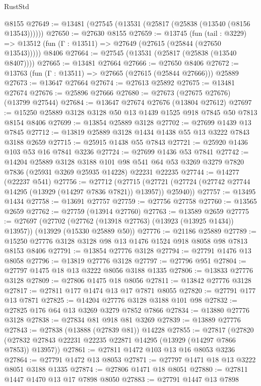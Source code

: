 \begin{lexlean}{RustStd}
\begin{coremodule}
    @8155
@27649 := @13481 (@27545 (@13531 (@25817 (@25838 (@13540 (@8156 @13543))))))
@27650 := @27630 @8155
@27659 := @13745
    (fun (tail : @3229) => @13512 (fun (Γ : @13511) => @27649 (@27615 (@25844 (@27650 @13543)))))
    @8406
@27664 := @27545 (@13531 (@25817 (@25838 (@13540 @8407))))
@27665 := @13481 @27664
@27666 := @27650 @8406
@27672 := @13763 (fun (Γ : @13511) => @27665 (@27615 (@25844 @27666))) @25889
@27673 := @13647 @27664
@27674 := @27613 @25892
@27675 := @13481 @27674
@27676 := @25896 @27666
@27680 := @27673 (@27675 @27676) (@13799 @27544)
@27684 := @13647 @27674 @27676 (@13804 @27612)
@27697 := @15250 @25889 @3128 @3128 @50 @13 @1439 @1525 @918 @7845 @50 @7813 @8154 @8406
@27699 := @13854 @25889 @3128
@27702 := @27699 @1439 @13 @7845
@27712 := @13819 @25889 @3128 @1434 @1438 @55 @13 @3222 @7843 @3188 @2659
@27715 := @25915 @1438 @55 @7843
@27721 := @25920 @1436 @103 @53 @16 @7841 @3236
@27724 := @27699 @1436 @53 @7841
@27742 := @14204
    @25889
    @3128
    @3188
    @101
    @98
    @541
    @64
    @53
    @3269
    @3279
    @7820
    @7836
    (@25931 @3269 @25935 @14228)
    @22231
    @22235
@27744 := @14277 (@22237 @541)
@27756 := @27712
    (@27715 (@27721 (@27724 (@27742 @27744 @14295 (@13929 (@14297 @7836 @7821)) @13957)) @25940))
@27757 := @13495 @1434
@27758 := @13691 @27757
@27759 := @27756 @27758
@27760 := @13565 @2659
@27762 := @27759 (@13914 @27760)
@27763 := @13589 @2659
@27775 := @27697
    (@27702 (@27762 (@13918 @27763) (@13923 (@13925 @1434)) @13957))
    (@13929 (@15330 @25889 @50))
@27776 := @21186 @25889
@27789 := @15250 @27776 @3128 @3128 @98 @13 @1476 @1524 @918 @8058 @98 @7813 @8153 @8406
@27791 := @13854 @27776 @3128
@27794 := @27791 @1476 @13 @8058
@27796 := @13819 @27776 @3128
@27797 := @27796 @951
@27804 := @27797 @1475 @18 @13 @3222 @8056 @3188 @1335
@27806 := @13833 @27776 @3128
@27809 := @27806 @1475 @18 @8056
@27811 := @13842 @27776 @3128
@27817 := @27811 @177 @1474 @13 @17 @7871 @8055
@27820 := @27791 @177 @13 @7871
@27825 := @14204 @27776 @3128 @3188 @101 @98
@27832 := @27825 @176 @64 @13 @3269 @3279 @7852 @7866
@27834 := @13880 @27776 @3128
@27838 := @27834 @81 @918 @81 @3269
@27839 := @13889 @27776
@27843 := @27838 (@13888 (@27839 @81)) @14228
@27855 := @27817
    (@27820 (@27832 @27843 @22231 @22235 @22871 @14295 (@13929 (@14297 @7866 @7853)) @13957))
@27861 := @27811 @1472 @103 @13 @16 @8053 @3236
@27864 := @27791 @1472 @13 @8053
@27871 := @27797 @1471 @18 @13 @3222 @8051 @3188 @1335
@27874 := @27806 @1471 @18 @8051
@27880 := @27811 @1447 @1470 @13 @17 @7898 @8050
@27883 := @27791 @1447 @13 @7898

\end{coremodule}
\end{lexlean}
